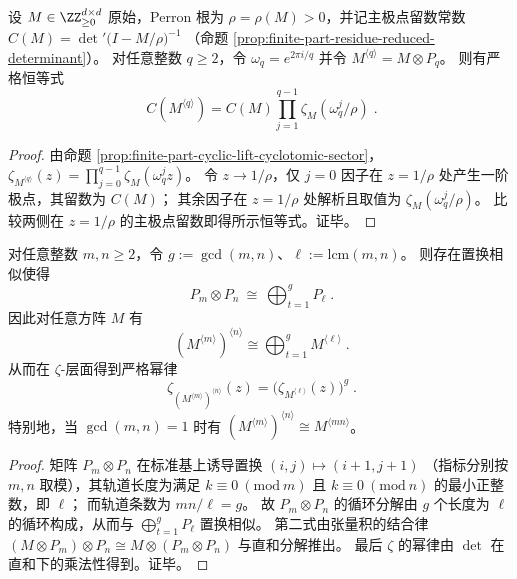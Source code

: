 \begin{proposition}\label{prop:finite-part-cyclic-lift-torsion-product}
设 \(M\in\ZZ_{\ge 0}^{d\times d}\) 原始，Perron 根为 \(\rho=\rho(M)>0\)，并记主极点留数常数
\(
C(M)=\det\nolimits'\!\bigl(I-M/\rho\bigr)^{-1}
\)
（命题 \ref{prop:finite-part-residue-reduced-determinant}）。
对任意整数 \(q\ge 2\)，令 \(\omega_q=e^{2\pi i/q}\) 并令 \(M^{\langle q\rangle}=M\otimes P_q\)。
则有严格恒等式
\[
\boxed{\;
C(M^{\langle q\rangle})
=C(M)\prod_{j=1}^{q-1}\zeta_M(\omega_q^j/\rho)\; }.
\]
\end{proposition}
\begin{proof}
由命题 \ref{prop:finite-part-cyclic-lift-cyclotomic-sector}，
\(
\zeta_{M^{\langle q\rangle}}(z)=\prod_{j=0}^{q-1}\zeta_M(\omega_q^j z)
\)。
令 \(z\to 1/\rho\)，仅 \(j=0\) 因子在 \(z=1/\rho\) 处产生一阶极点，其留数为 \(C(M)\)；
其余因子在 \(z=1/\rho\) 处解析且取值为 \(\zeta_M(\omega_q^j/\rho)\)。
比较两侧在 \(z=1/\rho\) 的主极点留数即得所示恒等式。证毕。
\end{proof}

\begin{proposition}\label{prop:finite-part-cyclic-lift-gcd-lcm}
对任意整数 \(m,n\ge 2\)，令 \(g:=\gcd(m,n)\)、\(\ell:=\mathrm{lcm}(m,n)\)。
则存在置换相似使得
\[
\boxed{\;
P_m\otimes P_n\ \cong\ \bigoplus_{t=1}^{g} P_{\ell}\; }.
\]
因此对任意方阵 \(M\) 有
\[
\boxed{\;
(M^{\langle m\rangle})^{\langle n\rangle}
\cong
\bigoplus_{t=1}^{g} M^{\langle \ell\rangle}\; }.
\]
从而在 \(\zeta\)-层面得到严格幂律
\[
\boxed{\;
\zeta_{(M^{\langle m\rangle})^{\langle n\rangle}}(z)
=\bigl(\zeta_{M^{\langle \ell\rangle}}(z)\bigr)^{g}\; }.
\]
特别地，当 \(\gcd(m,n)=1\) 时有 \((M^{\langle m\rangle})^{\langle n\rangle}\cong M^{\langle mn\rangle}\)。
\end{proposition}
\begin{proof}
矩阵 \(P_m\otimes P_n\) 在标准基上诱导置换
\(
(i,j)\mapsto(i+1,j+1)
\)
（指标分别按 \(m,n\) 取模），其轨道长度为满足 \(k\equiv 0\ (\mathrm{mod}\ m)\) 且 \(k\equiv 0\ (\mathrm{mod}\ n)\) 的最小正整数，即 \(\ell\)；
而轨道条数为 \(mn/\ell=g\)。
故 \(P_m\otimes P_n\) 的循环分解由 \(g\) 个长度为 \(\ell\) 的循环构成，从而与 \(\bigoplus_{t=1}^{g}P_\ell\) 置换相似。
第二式由张量积的结合律
\(
(M\otimes P_m)\otimes P_n\cong M\otimes(P_m\otimes P_n)
\)
与直和分解推出。
最后 \(\zeta\) 的幂律由 \(\det\) 在直和下的乘法性得到。证毕。
\end{proof}

